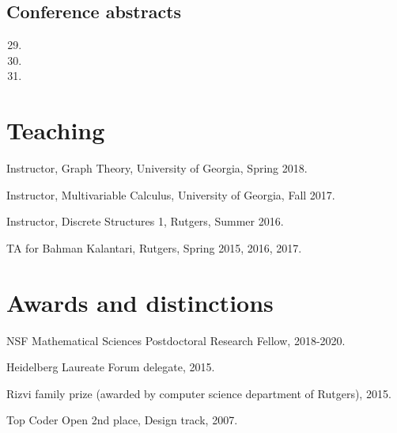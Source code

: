 \documentclass[letterpaper]{article}
\renewenvironment{itemize}{
  \begin{list}{}{
    \setlength{\leftmargin}{1.5em}
  }
}{
  \end{list}
}
\begin{document}
\subsection*{Conference abstracts}
\begin{enumerate}
	\setcounter{enumi}{28}
	\item {}
	\item {}
	\item {}
\end{enumerate}

\section*{Teaching}
\begin{itemize}
	\item Instructor, Graph Theory, University of Georgia, Spring 2018.
	\item Instructor, Multivariable Calculus, University of Georgia, Fall 2017.
	\item Instructor, Discrete Structures 1, Rutgers, Summer 2016.
	\item TA for Bahman Kalantari, Rutgers, Spring 2015, 2016, 2017.
\end{itemize}

\section*{Awards and distinctions}
\begin{itemize}
\item NSF Mathematical Sciences Postdoctoral Research Fellow, 2018-2020.
\item Heidelberg Laureate Forum delegate, 2015.
\item Rizvi family prize (awarded by computer science department of Rutgers), 2015.
\item Top Coder Open 2nd place, Design track, 2007.
\end{itemize}
\end{document}
